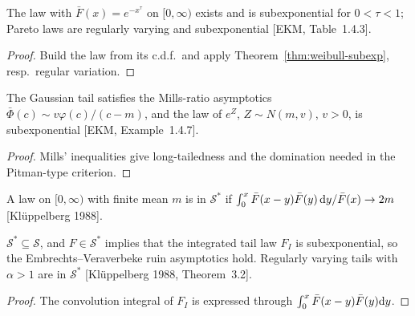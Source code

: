 \begin{proposition}
  \label{prop:subexp-examples}
  \leanok
  The law with $\bar F(x) = e^{-x^\tau}$ on $[0, \infty)$ exists and is subexponential for
  $0 < \tau < 1$; Pareto laws are regularly varying and subexponential [EKM, Table~1.4.3].
\end{proposition}
\begin{proof}
  \leanok
  Build the law from its c.d.f.\ and apply Theorem~\ref{thm:weibull-subexp}, resp.\ regular variation.
\end{proof}

\begin{theorem}
  \label{thm:lognormal-subexp}
  \leanok
  The Gaussian tail satisfies the Mills-ratio asymptotics $\bar\Phi(c) \sim v \varphi(c)/(c - m)$,
  and the law of $e^Z$, $Z \sim N(m, v)$, $v > 0$, is subexponential [EKM, Example~1.4.7].
\end{theorem}
\begin{proof}
  \leanok
  Mills' inequalities give long-tailedness and the domination needed in the Pitman-type criterion.
\end{proof}

\begin{definition}
  \label{def:s-star}
  \leanok
  A law on $[0, \infty)$ with finite mean $m$ is in $\mathcal S^*$ if
  $\int_0^x \bar F(x - y) \bar F(y) \, \mathrm{d} y / \bar F(x) \to 2m$ [Kl\"uppelberg 1988].
\end{definition}

\begin{theorem}
  \label{thm:s-star}
  \leanok
  $\mathcal S^* \subseteq \mathcal S$, and $F \in \mathcal S^*$ implies that the integrated tail law
  $F_I$ is subexponential, so the Embrechts--Veraverbeke ruin asymptotics hold. Regularly varying
  tails with $\alpha > 1$ are in $\mathcal S^*$ [Kl\"uppelberg 1988, Theorem~3.2].
\end{theorem}
\begin{proof}
  \leanok
  The convolution integral of $F_I$ is expressed through $\int_0^x \bar F(x-y)\bar F(y)\mathrm{d} y$.
\end{proof}

